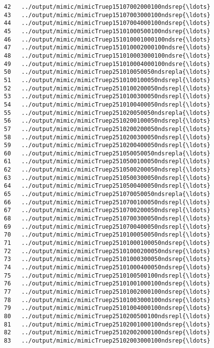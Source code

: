 \documentclass[11pt]{article}
\begin{document}
\begin{Verbatim}[commandchars=\\\{\}]
42   ../output/mimic/mimicTruep15107002000100ndsrep{\ldots}  
43   ../output/mimic/mimicTruep15107003000100ndsrep{\ldots}  
44   ../output/mimic/mimicTruep15107004000100ndsrep{\ldots}  
45   ../output/mimic/mimicTruep15101000500100ndsrep{\ldots}  
46   ../output/mimic/mimicTruep151010001000100ndsre{\ldots}  
47   ../output/mimic/mimicTruep151010002000100ndsre{\ldots}  
48   ../output/mimic/mimicTruep151010003000100ndsre{\ldots}  
49   ../output/mimic/mimicTruep151010004000100ndsre{\ldots}  
50   ../output/mimic/mimicTruep251010050050ndsrepla{\ldots}  
51   ../output/mimic/mimicTruep2510100100050ndsrepl{\ldots}  
52   ../output/mimic/mimicTruep2510100200050ndsrepl{\ldots}  
53   ../output/mimic/mimicTruep2510100300050ndsrepl{\ldots}  
54   ../output/mimic/mimicTruep2510100400050ndsrepl{\ldots}  
55   ../output/mimic/mimicTruep251020050050ndsrepla{\ldots}  
56   ../output/mimic/mimicTruep2510200100050ndsrepl{\ldots}  
57   ../output/mimic/mimicTruep2510200200050ndsrepl{\ldots}  
58   ../output/mimic/mimicTruep2510200300050ndsrepl{\ldots}  
59   ../output/mimic/mimicTruep2510200400050ndsrepl{\ldots}  
60   ../output/mimic/mimicTruep251050050050ndsrepla{\ldots}  
61   ../output/mimic/mimicTruep2510500100050ndsrepl{\ldots}  
62   ../output/mimic/mimicTruep2510500200050ndsrepl{\ldots}  
63   ../output/mimic/mimicTruep2510500300050ndsrepl{\ldots}  
64   ../output/mimic/mimicTruep2510500400050ndsrepl{\ldots}  
65   ../output/mimic/mimicTruep251070050050ndsrepla{\ldots}  
66   ../output/mimic/mimicTruep2510700100050ndsrepl{\ldots}  
67   ../output/mimic/mimicTruep2510700200050ndsrepl{\ldots}  
68   ../output/mimic/mimicTruep2510700300050ndsrepl{\ldots}  
69   ../output/mimic/mimicTruep2510700400050ndsrepl{\ldots}  
70   ../output/mimic/mimicTruep2510100050050ndsrepl{\ldots}  
71   ../output/mimic/mimicTruep25101000100050ndsrep{\ldots}  
72   ../output/mimic/mimicTruep25101000200050ndsrep{\ldots}  
73   ../output/mimic/mimicTruep25101000300050ndsrep{\ldots}  
74   ../output/mimic/mimicTruep25101000400050ndsrep{\ldots}  
75   ../output/mimic/mimicTruep2510100500100ndsrepl{\ldots}  
76   ../output/mimic/mimicTruep25101001000100ndsrep{\ldots}  
77   ../output/mimic/mimicTruep25101002000100ndsrep{\ldots}  
78   ../output/mimic/mimicTruep25101003000100ndsrep{\ldots}  
79   ../output/mimic/mimicTruep25101004000100ndsrep{\ldots}  
80   ../output/mimic/mimicTruep2510200500100ndsrepl{\ldots}  
81   ../output/mimic/mimicTruep25102001000100ndsrep{\ldots}  
82   ../output/mimic/mimicTruep25102002000100ndsrep{\ldots}  
83   ../output/mimic/mimicTruep25102003000100ndsrep{\ldots}  

\end{Verbatim}
\end{document}

